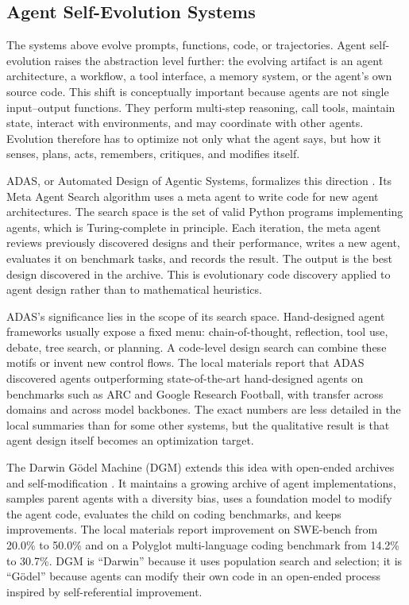 \subsection{Agent Self-Evolution Systems}
\label{subsec:agent-self-evolution-systems}

The systems above evolve prompts, functions, code, or trajectories.  Agent self-evolution raises the abstraction level further: the evolving artifact is an agent architecture, a workflow, a tool interface, a memory system, or the agent's own source code.  This shift is conceptually important because agents are not single input--output functions.  They perform multi-step reasoning, call tools, maintain state, interact with environments, and may coordinate with other agents.  Evolution therefore has to optimize not only what the agent says, but how it senses, plans, acts, remembers, critiques, and modifies itself.

ADAS, or Automated Design of Agentic Systems, formalizes this direction \cite{adas2025}.  Its Meta Agent Search algorithm uses a meta agent to write code for new agent architectures.  The search space is the set of valid Python programs implementing agents, which is Turing-complete in principle.  Each iteration, the meta agent reviews previously discovered designs and their performance, writes a new agent, evaluates it on benchmark tasks, and records the result.  The output is the best design discovered in the archive.  This is evolutionary code discovery applied to agent design rather than to mathematical heuristics.

ADAS's significance lies in the scope of its search space.  Hand-designed agent frameworks usually expose a fixed menu: chain-of-thought, reflection, tool use, debate, tree search, or planning.  A code-level design search can combine these motifs or invent new control flows.  The local materials report that ADAS discovered agents outperforming state-of-the-art hand-designed agents on benchmarks such as ARC and Google Research Football, with transfer across domains and across model backbones.  The exact numbers are less detailed in the local summaries than for some other systems, but the qualitative result is that agent design itself becomes an optimization target.

The Darwin G{\"o}del Machine (DGM) extends this idea with open-ended archives and self-modification \cite{darwingodelmachine2025}.  It maintains a growing archive of agent implementations, samples parent agents with a diversity bias, uses a foundation model to modify the agent code, evaluates the child on coding benchmarks, and keeps improvements.  The local materials report improvement on SWE-bench from 20.0\% to 50.0\% and on a Polyglot multi-language coding benchmark from 14.2\% to 30.7\%.  DGM is ``Darwin'' because it uses population search and selection; it is ``G{\"o}del'' because agents can modify their own code in an open-ended process inspired by self-referential improvement.

